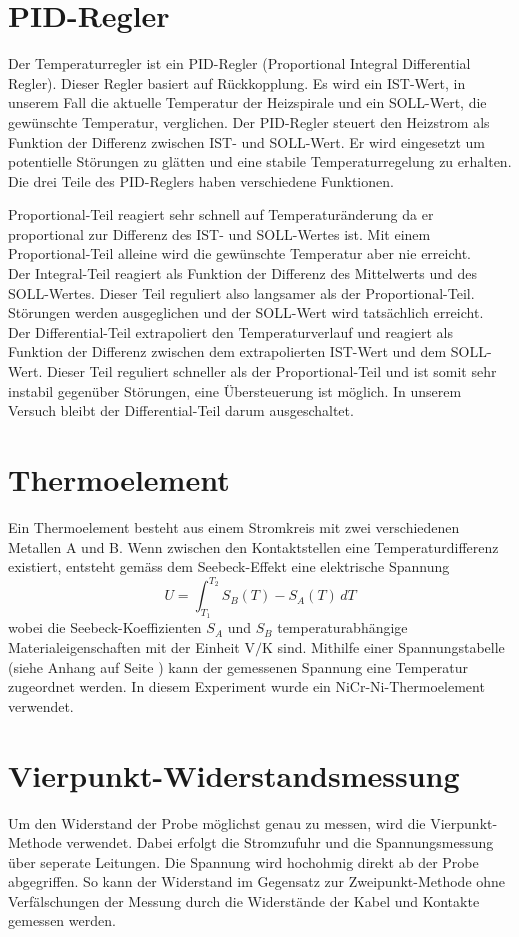 \documentclass[a4paper,parskip,11pt, DIV12]{scrreprt}
\begin{document}
\section{PID-Regler}
\label{PID_Regler}
Der Temperaturregler ist ein PID-Regler (Proportional Integral Differential Regler). Dieser Regler basiert auf Rückkopplung. Es wird ein IST-Wert, in unserem Fall die aktuelle Temperatur der Heizspirale und ein SOLL-Wert, die gewünschte Temperatur, verglichen. Der PID-Regler steuert den Heizstrom als Funktion der Differenz zwischen IST- und SOLL-Wert. Er wird eingesetzt um potentielle Störungen zu glätten und eine stabile Temperaturregelung zu erhalten. Die drei Teile des PID-Reglers haben verschiedene Funktionen.

Proportional-Teil reagiert sehr schnell auf Temperaturänderung da er proportional zur Differenz des IST- und SOLL-Wertes ist. Mit einem Proportional-Teil alleine wird die gewünschte Temperatur aber nie erreicht.\\
Der Integral-Teil reagiert als Funktion der Differenz des Mittelwerts und des SOLL-Wertes. Dieser Teil reguliert also langsamer als der Proportional-Teil. Störungen werden ausgeglichen und der SOLL-Wert wird tatsächlich erreicht.\\
Der Differential-Teil extrapoliert den Temperaturverlauf und reagiert als Funktion der Differenz zwischen dem extrapolierten IST-Wert und dem SOLL-Wert. Dieser Teil reguliert schneller als der Proportional-Teil und ist somit sehr instabil gegenüber Störungen, eine Übersteuerung ist möglich.
In unserem Versuch bleibt der Differential-Teil darum ausgeschaltet. 


\section{Thermoelement}
Ein Thermoelement besteht aus einem Stromkreis mit zwei verschiedenen Metallen A und B. Wenn zwischen den Kontaktstellen eine Temperaturdifferenz existiert, entsteht gemäss dem Seebeck-Effekt eine elektrische Spannung 
$$ U = \int_{T_{1}}^{T_{2}} S_{B}(T) - S_{A}(T) \, dT $$
wobei die Seebeck-Koeffizienten $S_{A}$ und $S_{B}$ temperaturabhängige Materialeigenschaften mit der Einheit V$/$K sind. Mithilfe einer Spannungstabelle (siehe Anhang auf Seite \pageref{Kacktabelle}) kann der gemessenen Spannung eine Temperatur zugeordnet werden. In diesem Experiment wurde ein NiCr-Ni-Thermoelement verwendet.

\section{Vierpunkt-Widerstandsmessung}
Um den Widerstand der Probe möglichst genau zu messen, wird die Vierpunkt-Methode verwendet. Dabei erfolgt die Stromzufuhr und die Spannungsmessung über seperate Leitungen. Die Spannung wird hochohmig direkt ab der Probe abgegriffen. So kann der Widerstand im Gegensatz zur Zweipunkt-Methode ohne Verfälschungen der Messung durch die Widerstände der Kabel und Kontakte gemessen werden.
\end{document}
